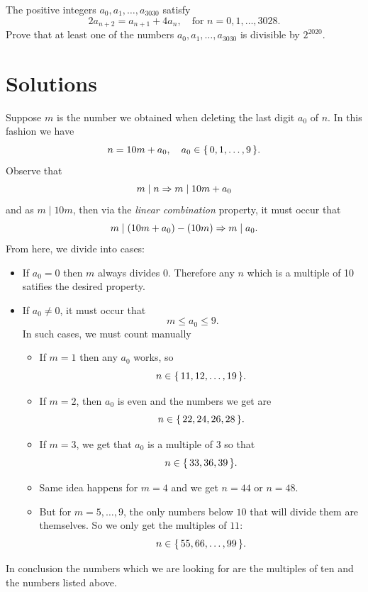 \documentclass[12pt]{memoir}
\begin{document}
\begin{Ej}
The positive integers \(a_0, a_1, \dots, a_{3030}\) satisfy
\[
    2a_{n+2} = a_{n+1} + 4a_n, \quad \text{for } n = 0, 1, \dots, 3028.
\]
Prove that at least one of the numbers \(a_0, a_1, \dots, a_{3030}\) is divisible by \(2^{2020}\).
\end{Ej}

\newpage
\section*{Solutions}
\setcounter{Ej}{0}
\begin{Ej}
    Suppose \(m\) is the number we obtained when deleting the last digit \(a_0\) of \(n\). In this fashion we have 
    \[
    n=10m+a_0,\quad a_0\in\{\,0,1,\dots,9\,\}.
    \]
    Observe that 
    \[
    m\mid n\To m\mid 10m+a_0
    \]
    and as \(m\mid 10m\), then via the \emph{linear combination} property, it must occur that 
    \[
    m\mid (10m+a_0)-(10m)\To m\mid a_0.
    \]
    From here, we divide into cases:
    \begin{itemize}
        \item If \(a_0=0\) then \(m\) always divides \(0\). Therefore any \(n\) which is a multiple of 10 satifies the desired property.
        \item If \(a_0\neq 0\), it must occur that 
        \[
        m\leq a_0\leq 9.
        \]
        In such cases, we must count manually
        \begin{itemize}
            \item If \(m=1\) then any \(a_0\) works, so 
            \[
            n\in\{\,11,12,\dots,19\,\}.
            \]
            \item If \(m=2\), then \(a_0\) is even and the numbers we get are
            \[
            n\in \{\,22,24,26,28\,\}.
            \]
            \item If \(m=3\), we get that \(a_0\) is a multiple of \(3\) so that 
            \[
            n\in\{\,33,36,39\,\}.
            \]
            \item Same idea happens for \(m=4\) and we get \(n=44\) or \(n=48\).
            \item But for \(m=5,\dots,9\), the only numbers below \(10\) that will divide them are themselves. So we only get the multiples of \(11\):
            \[
            n\in\{\,55,66,\dots,99\,\}.
            \]
        \end{itemize}
    \end{itemize}
    In conclusion the numbers which we are looking for are the multiples of ten and the numbers listed above.

\end{Ej}
\end{document}
